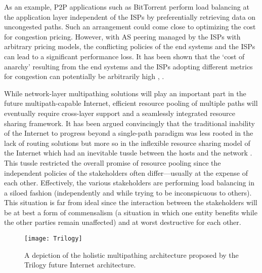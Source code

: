 \documentclass[10pt]{IEEEtran}
\begin{document}
As an example, P2P applications such as BitTorrent perform load balancing at the application layer independent of the ISPs by preferentially retrieving data on uncongested paths. Such an arrangement could come close to optimizing the cost for congestion pricing. However, with AS peering managed by the ISPs with arbitrary pricing models, the conflicting policies of the end systems and the ISPs can lead to a significant performance loss. It has been shown that the `cost of anarchy' resulting from the end systems and the ISPs adopting different metrics for congestion can potentially be arbitrarily high \cite{roughgarden2002bad},  \cite{acemoglu2007partially}. 

While network-layer multipathing solutions will play an important part in the future multipath-capable Internet, efficient resource pooling of multiple paths will eventually require cross-layer support and a seamlessly integrated resource sharing framework. It has been argued convincingly that the traditional inability of the Internet to progress beyond a single-path paradigm was less rooted in the lack of routing solutions but more so in the inflexible resource sharing model of the Internet which had an inevitable tussle between the hosts and the network \cite{clark2002tussle}. This tussle restricted the overall promise of resource pooling since the independent policies of the stakeholders often differ---usually at the expense of each other. Effectively, the various stakeholders are performing load balancing in a siloed fashion (independently and while trying to be inconspicuous to others). This situation is far from ideal since the interaction between the stakeholders will be at best a form of commensalism (a situation in which one entity benefits while the other parties remain unaffected) and at worst destructive for each other.

\begin{figure}

\centering
\texttt{[image: Trilogy]}
\caption{A depiction of the holistic multipathing architecture proposed 
by the Trilogy future Internet architecture.}
\label{fig:trilogy}

\end{figure} 
\end{document}

